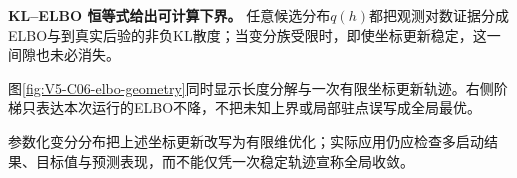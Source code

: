 \documentclass[UTF8,a4paper,11pt,openany]{ctexbook}
\begin{document}
\setcounter{page}{869}
\setcounter{chapter}{35}
\setcounter{section}{3}
\setcounter{figure}{4}
\pagestyle{headings}
\textbf{KL--ELBO 恒等式给出可计算下界。}
任意候选分布$q(h)$都把观测对数证据分成ELBO与到真实后验的非负KL散度；当变分族受限时，即使坐标更新稳定，这一间隙也未必消失。

图\ref{fig:V5-C06-elbo-geometry}同时显示长度分解与一次有限坐标更新轨迹。右侧阶梯只表达本次运行的ELBO不降，不把未知上界或局部驻点误写成全局最优。

\FloatBarrier
参数化变分分布把上述坐标更新改写为有限维优化；实际应用仍应检查多启动结果、目标值与预测表现，而不能仅凭一次稳定轨迹宣称全局收敛。
\end{document}
